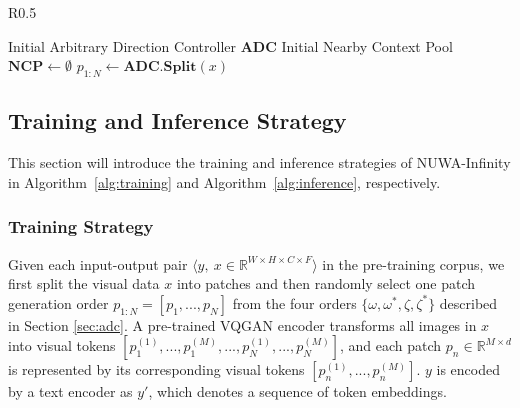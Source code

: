 \documentclass{article}
\begin{document}
\begin{wrapfigure}[12]{R}{0.5\textwidth}
\vspace{-0.17in}
\begin{minipage}{1\linewidth}
\begin{algorithm}[H]\label{alg:training}
\SetAlgoNoLine
\caption{Training Strategy}

Initial Arbitrary Direction Controller \textbf{ADC}\;
Initial Nearby Context Pool $ \textbf{NCP} \leftarrow \emptyset $ \;
$p_{1:N} \leftarrow \textbf{ADC.Split}(x)$\;
\end{algorithm}
\end{minipage}
\end{wrapfigure}

\subsection{Training and Inference Strategy}\label{sec:train}
This section will introduce the training and inference strategies of NUWA-Infinity in Algorithm~\ref{alg:training} and Algorithm~\ref{alg:inference}, respectively.


\subsubsection{Training Strategy}\label{sec:ts}

Given each input-output pair $\langle y,~x\in \mathbb{R}^{W\times H\times C\times F} \rangle$ in the pre-training corpus, we first split the visual data $x$ into patches and then randomly select one patch generation order $p_{1:N}=[p_1,...,p_N]$ from the four orders $\{\omega, \omega^*, \zeta, \zeta^*\}$ described in Section  \ref{sec:adc}. A pre-trained VQGAN encoder \cite{esserTamingTransformersHighResolution2021} transforms all images in $x$ into visual tokens $[p_1^{(1)},...,p_1^{(M)},...,p_N^{(1)},...,p_N^{(M)}]$, and each patch $p_n\in \mathbb{R}^{M\times d}$ is represented by its corresponding visual tokens $[p_n^{(1)},...,p_n^{(M)}]$. $y$ is encoded by a text encoder as $y'$, which denotes a sequence of token embeddings.
\end{document}

